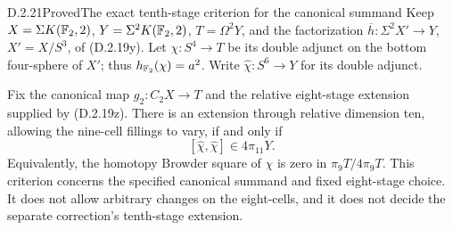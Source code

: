 \begin{claim}{D.2.21}{Proved}{The exact tenth-stage criterion for the canonical summand}
Keep $X=\Sigma K(\mathbb F_2,2)$, $Y=\Sigma^2K(\mathbb F_2,2)$,
$T=\Omega^2Y$, and the factorization
$\overline h:\Sigma^2X'\to Y$, $X'=X/S^3$, of
\textup{(D.2.19y)}. Let $\chi:S^4\to T$ be its double
adjunct on the bottom four-sphere of $X'$; thus
$h_{\mathbb F_2}(\chi)=a^2$. Write
$\widehat\chi:S^6\to Y$ for its double adjunct.

Fix the canonical map $g_2:C_2X\to T$ and the relative
eight-stage extension supplied by \textup{(D.2.19z)}.
There is an extension through relative dimension ten,
allowing the nine-cell fillings to vary, if and only if
\[
 [\widehat\chi,\widehat\chi]\in4\pi_{11}Y.
 \tag{D.2.21a}
\]
Equivalently, the homotopy Browder square of $\chi$ is zero
in $\pi_9T/4\pi_9T$. This criterion concerns the specified
canonical summand and fixed eight-stage choice. It does not
allow arbitrary changes on the eight-cells, and it does not
decide the separate correction's tenth-stage extension.
\end{claim}
